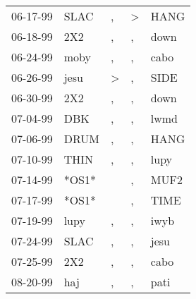 \begin{supertabular}{p{0.07\textwidth}p{0.06\textwidth}p{0.02\textwidth}p{0.02\textwidth}p{0.06\textwidth}}
          06-17-99\textsuperscript{} &           SLAC\textsuperscript{} &                , &     \textgreater &           HANG\textsuperscript{} \\
          06-18-99\textsuperscript{} &            2X2\textsuperscript{} &                , &                , &           down\textsuperscript{} \\
          06-24-99\textsuperscript{} &           moby\textsuperscript{} &                , &                , &           cabo\textsuperscript{} \\
          06-26-99\textsuperscript{} &           jesu\textsuperscript{} &     \textgreater &                , &           SIDE\textsuperscript{} \\
          06-30-99\textsuperscript{} &            2X2\textsuperscript{} &                , &                , &           down\textsuperscript{} \\
          07-04-99\textsuperscript{} &            DBK\textsuperscript{} &                , &                , &           lwmd\textsuperscript{} \\
          07-06-99\textsuperscript{} &           DRUM\textsuperscript{} &                , &                , &           HANG\textsuperscript{} \\
          07-10-99\textsuperscript{} &           THIN\textsuperscript{} &                , &                , &           lupy\textsuperscript{} \\
          07-14-99\textsuperscript{} &                            *OS1* &                  &                , &           MUF2\textsuperscript{} \\
          07-17-99\textsuperscript{} &                            *OS1* &                  &                , &           TIME\textsuperscript{} \\
          07-19-99\textsuperscript{} &           lupy\textsuperscript{} &                , &                , &           iwyb\textsuperscript{} \\
          07-24-99\textsuperscript{} &           SLAC\textsuperscript{} &                , &                , &           jesu\textsuperscript{} \\
          07-25-99\textsuperscript{} &            2X2\textsuperscript{} &                , &                , &           cabo\textsuperscript{} \\
          08-20-99\textsuperscript{} &            haj\textsuperscript{} &                , &                , &           pati\textsuperscript{} \\

\end{supertabular}
